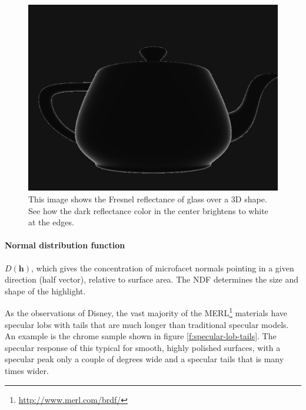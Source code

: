 \begin{figure}
\sidecaption
	\includegraphics[width=.65\textwidth]{graphics/gi/ray-optics-12}
	\caption{This image shows the Fresnel reflectance of glass over a 3D shape. See how the dark reflectance color in the center brightens to white at the edges.}
	\label{f:fresnell-effect}
\end{figure}




\paragraph{\textbf{Normal distribution function}} $D(\mathbf{h})$, which gives the concentration of microfacet normals pointing in a given direction (half vector), relative to surface area. The NDF determines the size and shape of the highlight.

As the observations of Disney, the vast majority of the MERL\footnote{\url{http://www.merl.com/brdf/}} materials have specular lobs with tails that are much longer than traditional specular models. An example is the chrome sample shown in figure \ref{f:specular-lob-tails}. The specular response of this typical for smooth, highly polished surfaces, with a specular peak only a couple of degrees wide and a specular tails that is many times wider.

